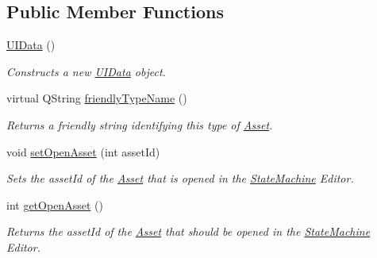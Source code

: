 \subsection*{Public Member Functions}
\begin{DoxyCompactItemize}
\item 
\hyperlink{class_picto_1_1_u_i_data_afecd4296094cdd2fbe3e60e5aea73494}{U\-I\-Data} ()
\begin{DoxyCompactList}\small\item\em Constructs a new \hyperlink{class_picto_1_1_u_i_data}{U\-I\-Data} object. \end{DoxyCompactList}\item 
virtual Q\-String \hyperlink{class_picto_1_1_u_i_data_aa197be2adc238a211ada4fdde83d8480}{friendly\-Type\-Name} ()
\begin{DoxyCompactList}\small\item\em Returns a friendly string identifying this type of \hyperlink{class_picto_1_1_asset}{Asset}. \end{DoxyCompactList}\item 
\hypertarget{class_picto_1_1_u_i_data_a1768c5ce60e19f81d14cc063e6c4767a}{void \hyperlink{class_picto_1_1_u_i_data_a1768c5ce60e19f81d14cc063e6c4767a}{set\-Open\-Asset} (int asset\-Id)}\label{class_picto_1_1_u_i_data_a1768c5ce60e19f81d14cc063e6c4767a}

\begin{DoxyCompactList}\small\item\em Sets the asset\-Id of the \hyperlink{class_picto_1_1_asset}{Asset} that is opened in the \hyperlink{class_picto_1_1_state_machine}{State\-Machine} Editor. \end{DoxyCompactList}\item 
\hypertarget{class_picto_1_1_u_i_data_aa3868d6a0ade94114cf018386212fe84}{int \hyperlink{class_picto_1_1_u_i_data_aa3868d6a0ade94114cf018386212fe84}{get\-Open\-Asset} ()}\label{class_picto_1_1_u_i_data_aa3868d6a0ade94114cf018386212fe84}

\begin{DoxyCompactList}\small\item\em Returns the asset\-Id of the \hyperlink{class_picto_1_1_asset}{Asset} that should be opened in the \hyperlink{class_picto_1_1_state_machine}{State\-Machine} Editor. \end{DoxyCompactList}\end{DoxyCompactItemize}
